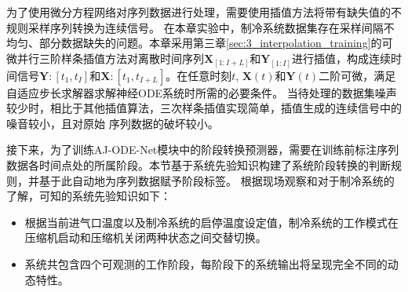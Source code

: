 为了使用微分方程网络对序列数据进行处理，需要使用插值方法将带有缺失值的不规则采样序列转换为连续信号。
在本章实验中，制冷系统数据集存在采样间隔不均匀、部分数据缺失的问题。本章采用第三章\ref{sec:3_interpolation_training}的可微并行三阶样条插值方法对离散时间序列$\boldsymbol X_{[1:I+L]}$和$\boldsymbol Y_{[1:I]}$进行插值，构成连续时间信号$\boldsymbol Y:[t_1,t_{I}]$和$\boldsymbol X:[t_1,t_{I+L}]$。在任意时刻$t$,  $\boldsymbol X(t)$和$\boldsymbol Y(t)$二阶可微，满足自适应步长求解器求解神经ODE系统时所需的必要条件\cite{kidger2020neural}。
当待处理的数据集噪声较少时，相比于其他插值算法，三次样条插值实现简单，插值生成的连续信号中的噪音较小，且对原始
序列数据的破坏较小。

接下来，为了训练AJ-ODE-Net模块中的阶段转换预测器，需要在训练前标注序列数据各时间点处的所属阶段。本节基于系统先验知识构建了系统阶段转换的判断规则，并基于此自动地为序列数据赋予阶段标签。
根据现场观察和对于制冷系统的了解，可知的系统先验知识如下：
\begin{itemize}[nosep]
    \item 根据当前进气口温度以及制冷系统的启停温度设定值，制冷系统的工作模式在压缩机启动和压缩机关闭两种状态之间交替切换。
    \item 系统共包含四个可观测的工作阶段，每阶段下的系统输出将呈现完全不同的动态特性。
\end{itemize}

